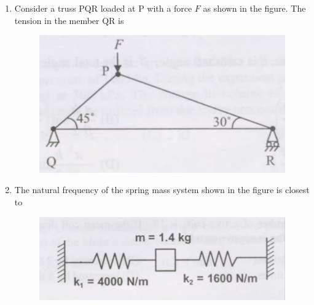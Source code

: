 \documentclass[journal,12pt,onecolumn]{IEEEtran}
\begin{document}
\begin{enumerate}
    \item Consider a truss PQR loaded at P with a force $F$ as shown in the figure.
          The tension in the member QR is

          \begin{figure}[H]
              \centering
              \includegraphics[scale=0.3]{q34}
              \caption{}
              \label{q34}
          \end{figure}

          \begin{enumerate}
          \end{enumerate}

    \item The natural frequency of the spring mass system shown in the figure is closest to

          \begin{figure}[H]
              \centering
              \includegraphics[scale=0.3]{q35}
              \caption{}
              \label{q35}
          \end{figure}


\end{enumerate}
\end{document}
